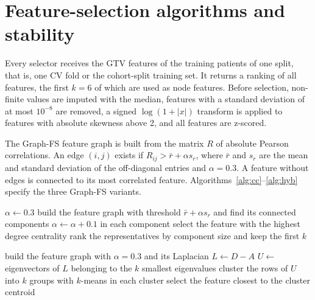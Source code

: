 \documentclass[11pt]{article}
\begin{document}
\section{Feature-selection algorithms and stability}

Every selector receives the GTV features of the training patients of one split, that is, one CV fold or the cohort-split training set. It returns a ranking of all features, the first $k=6$ of which are used as node features. Before selection, non-finite values are imputed with the median, features with a standard deviation of at most $10^{-8}$ are removed, a signed $\log(1+|x|)$ transform is applied to features with absolute skewness above 2, and all features are z-scored.

The Graph-FS feature graph is built from the matrix $R$ of absolute Pearson correlations. An edge $(i,j)$ exists if $R_{ij} > \bar r + \alpha s_r$, where $\bar r$ and $s_r$ are the mean and standard deviation of the off-diagonal entries and $\alpha=0.3$. A feature without edges is connected to its most correlated feature. Algorithms~\ref{alg:cc}--\ref{alg:hyb} specify the three Graph-FS variants.

\begin{algorithm}[H]
\caption{Graph-FS, connected components (CC)}\label{alg:cc}
\begin{algorithmic}[1]
\State $\alpha \gets 0.3$
\Repeat
  \State build the feature graph with threshold $\bar r+\alpha s_r$ and find its connected components
  \State $\alpha \gets \alpha + 0.1$
\State in each component select the feature with the highest degree centrality
\State rank the representatives by component size and keep the first $k$
\end{algorithmic}
\end{algorithm}

\begin{algorithm}[H]
\caption{Graph-FS, spectral}\label{alg:spec}
\begin{algorithmic}[1]
\State build the feature graph with $\alpha=0.3$ and its Laplacian $L \gets D - A$
\State $U \gets$ eigenvectors of $L$ belonging to the $k$ smallest eigenvalues
\State cluster the rows of $U$ into $k$ groups with $k$-means
\State in each cluster select the feature closest to the cluster centroid
\end{algorithmic}
\end{algorithm}
\end{document}

